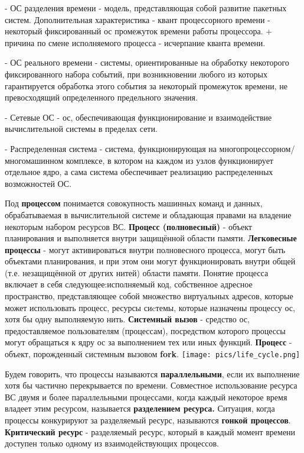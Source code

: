 - ОС разделения времени - модель, представляющая собой развитие пакетных систем. Дополнительная характеристика - квант процессорного времени - некоторый фиксированный ос промежуток времени работы процессора. + причина по смене исполняемого процесса - исчерпание кванта времени. 

- ОС реального времени - системы, ориентированные на обработку некоторого фиксированного набора событий, при возникновении любого из которых гарантируется обработка этого события за некоторый промежуток времени, не превосходящий определенного предельного значения. 

- Сетевые ОС - ос, обеспечивающая функционирование и взаимодействие вычислительной системы в пределах сети. 

- Распределенная система - система, функционирующая на многопроцессорном/многомашинном комплексе, в котором на каждом из узлов функционирует отдельное ядро, а сама система обеспечивает реализацию распределенных возможностей ОС. 

Под \textbf{процессом} понимается совокупность машинных команд и данных, обрабатываемая в вычислительной системе и обладающая правами на владение некоторым набором ресурсов ВС. \textbf{Процесс (полновесный)} - объект планирования и выполняется внутри защищённой области памяти. \textbf{Легковесные процессы} - могут активироваться внутри полновесного процесса, могут быть объектами планирования, и при этом они могут функционировать внутри общей (т.е. незащищённой от других нитей) области памяти. Понятие процесса включает в себя следующее:исполняемый код, собственное адресное пространство, представляющее собой множество виртуальных адресов, которые может использовать процесс, ресурсы сиcтемы, которые назначены процессу ос, хотя бы одну выполняемую нить. 
\textbf{Системный вызов} - средство ос, предоставляемое пользователям (процессам), посредством которого процессы могут обращаться к ядру ос за выполнением тех или иных функций.
\textbf{Процесс} - объект, порожденный системным вызовом \textbf{fork}. 
\texttt{[image: pics/life\_cycle.png]}

Будем говорить, что процессы называются \textbf{параллельными}, если их выполнение хотя бы частично перекрывается по времени.
Совместное использование ресурса ВС двумя и более параллельными процессами, когда каждый некоторое время владеет этим ресурсом, называется \textbf{разделением ресурса.} Ситуация, когда процессы конкурируют за разделяемый ресурс, называются \textbf{гонкой процессов}. \textbf{Критический ресурс} - разделяемый ресурс, который в каждый момент времени доступен только одному из взаимодействующих процессов.  

